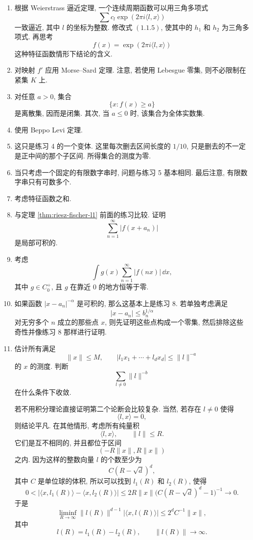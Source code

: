 \begin{enumerate}
	\item 根据 Weierstrass 逼近定理, 一个连续周期函数可以用三角多项式
	\[
	\sum c_l \exp(2\pi i\langle l,x\rangle)
	\]
	一致逼近, 其中 \(l\) 的坐标为整数. 修改式 \((1.1.5)\), 使其中的
	\(h_1\) 和 \(h_2\) 为三角多项式. 再思考
	\[
	f(x)=\exp(2\pi i\langle l,x\rangle)
	\]
	这种特征函数情形下结论的含义.
	
	\item 对映射 \(f'\) 应用 Morse--Sard 定理. 注意, 若使用 Lebesgue 零集, 则不必限制在紧集 \(K\) 上.
	
	\item 对任意 \(a>0\), 集合
	\[
	\{x:f(x)\geq a\}
	\]
	是离散集, 因而是闭集. 其次, 当 \(a\leq0\) 时, 该集合为全体实数集.
	
	\item 使用 Beppo Levi 定理.
	
	\item 这只是练习 4 的一个变体. 这里每次删去区间长度的 \(1/10\), 只是删去的不一定是正中间的那个子区间. 所得集合的测度为零.
	
	\item 当只考虑一个固定的有限数字串时, 问题与练习 5 基本相同. 最后注意, 有限数字串只有可数多个.
	
	\item 考虑特征函数之和.
	
	\item 与定理 \ref{thm:riesz-fischer-l1} 前面的练习比较. 证明
	\[
	\sum_{n=1}^{\infty}|f(x+a_n)|
	\]
	是局部可积的.
	
	\item 考虑
	\[
	\int g(x)\sum_{n=1}^{\infty}|f(nx)|\,\dd x,
	\]
	其中 \(g\in C_0^+\), 且 \(g\) 在靠近 \(0\) 的地方恒等于零.
	
	\item 如果函数 \(|x-a_n|^{-\alpha}\) 是可积的, 那么这基本上是练习 8. 若单独考虑满足
	\[
	|x-a_n|\leq b_n^{1/\alpha}
	\]
	对无穷多个 \(n\) 成立的那些点 \(x\), 则先证明这些点构成一个零集, 然后排除这些奇性并像练习 8 那样进行证明.
	
	\item 估计所有满足
	\[
	\|x\|\leq M,
	\qquad
	|l_1x_1+\cdots+l_dx_d|\leq \|l\|^{-a}
	\]
	的 \(x\) 的测度. 判断
	\[
	\sum_{l\ne0}\|l\|^{-b}
	\]
	在什么条件下收敛.
	
	若不用积分理论直接证明第二个论断会比较复杂. 当然, 若存在 \(l\ne0\) 使得
	\[
	\langle l,x\rangle=0,
	\]
	则结论平凡. 在其他情形, 考虑所有纯量积
	\[
	\langle l,x\rangle,
	\qquad \|l\|\leq R.
	\]
	它们是互不相同的, 并且都位于区间
	\[
	(-R\|x\|,R\|x\|)
	\]
	之内. 因为这样的整数向量 \(l\) 的个数至少为
	\[
	C(R-\sqrt d)^d,
	\]
	其中 \(C\) 是单位球的体积, 所以可以找到 \(l_1(R)\) 和 \(l_2(R)\), 使得
	\[
	0<
	|\langle x,l_1(R)\rangle-\langle x,l_2(R)\rangle|
	\leq
	2R\|x\|
	\bigl(C(R-\sqrt d)^d-1\bigr)^{-1}\to0.
	\]
	于是
	\[
	\liminf_{R\to\infty}
	\|l(R)\|^{d-1}|\langle x,l(R)\rangle|
	\leq
	2^dC^{-1}\|x\|,
	\]
	其中
	\[
	l(R)=l_1(R)-l_2(R),
	\qquad \|l(R)\|\to\infty.
	\]
	

\end{enumerate}
